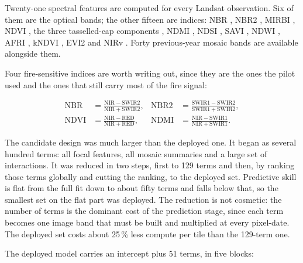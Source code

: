 \documentclass[11pt,a4paper]{article}
\begin{document}
Twenty-one spectral features are computed for every Landsat observation. Six of them are the
optical bands; the other fifteen are indices: NBR \parencite{key_benson_2006}, NBR2
\parencite{usgs_landsat_burned_area_2021}, MIRBI \parencite{trigg_flasse_2001}, NDVI
\parencite{tucker_1979}, the three tasselled-cap components \parencite{baig2014tasseled}, NDMI
\parencite{gao1996ndwi}, NDSI \parencite{hall1995ndsi}, SAVI \parencite{huete1988savi}, NDWI
\parencite{mcfeeters1996ndwi}, AFRI \parencite{karnieli2001afri}, kNDVI
\parencite{campsvalls2021kndvi}, EVI2 \parencite{jiang2008evi2} and NIRv
\parencite{badgley2017nirv}. Forty previous-year mosaic bands are available alongside them.

Four fire-sensitive indices are worth writing out, since they are the ones the pilot used and the
ones that still carry most of the fire signal:

\begin{equation*}
  \begin{aligned}
    \mathrm{NBR}  &= \frac{\mathrm{NIR} - \mathrm{SWIR2}}{\mathrm{NIR} + \mathrm{SWIR2}}, &
    \mathrm{NBR2} &= \frac{\mathrm{SWIR1} - \mathrm{SWIR2}}{\mathrm{SWIR1} + \mathrm{SWIR2}}, \\[4pt]
    \mathrm{NDVI} &= \frac{\mathrm{NIR} - \mathrm{RED}}{\mathrm{NIR} + \mathrm{RED}}, &
    \mathrm{NDMI} &= \frac{\mathrm{NIR} - \mathrm{SWIR1}}{\mathrm{NIR} + \mathrm{SWIR1}}.
  \end{aligned}
\end{equation*}

The candidate design was much larger than the deployed one. It began as several hundred terms: all
focal features, all mosaic summaries and a large set of interactions. It was reduced in two steps,
first to 129 terms and then, by ranking those terms globally and cutting the ranking, to the
deployed set. Predictive skill is flat from the full fit down to about fifty terms and falls below
that, so the smallest set on the flat part was deployed. The reduction is not cosmetic: the number
of terms is the dominant cost of the prediction stage, since each term becomes one image band that
must be built and multiplied at every pixel-date. The deployed set costs about 25\,\% less compute
per tile than the 129-term one.

The deployed model carries an intercept plus 51 terms, in five blocks:
\end{document}
